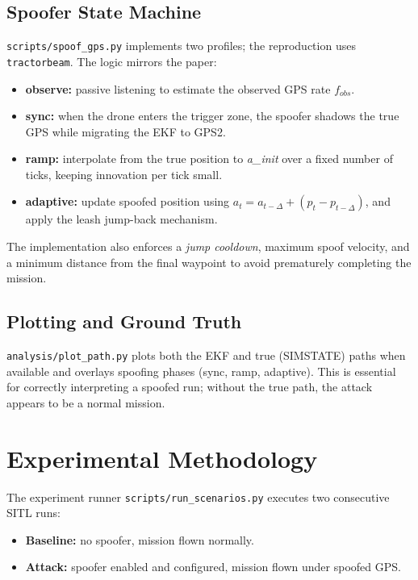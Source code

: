 \documentclass[12pt, a4paper]{article}
\begin{document}
\subsection{Spoofer State Machine}
\texttt{scripts/spoof\_gps.py} implements two profiles; the reproduction uses \texttt{tractorbeam}. The logic mirrors the paper:
\begin{itemize}[noitemsep]
  \item \textbf{observe:} passive listening to estimate the observed GPS rate $f_{obs}$.
  \item \textbf{sync:} when the drone enters the trigger zone, the spoofer shadows the true GPS while migrating the EKF to GPS2.
  \item \textbf{ramp:} interpolate from the true position to \textit{a\_init} over a fixed number of ticks, keeping innovation per tick small.
  \item \textbf{adaptive:} update spoofed position using $a_t = a_{t-\Delta} + (p_t - p_{t-\Delta})$, and apply the leash jump-back mechanism.
\end{itemize}

The implementation also enforces a \textit{jump cooldown}, maximum spoof velocity, and a minimum distance from the final waypoint to avoid prematurely completing the mission.

\subsection{Plotting and Ground Truth}
\texttt{analysis/plot\_path.py} plots both the EKF and true (SIMSTATE) paths when available and overlays spoofing phases (sync, ramp, adaptive). This is essential for correctly interpreting a spoofed run; without the true path, the attack appears to be a normal mission.

\section{Experimental Methodology}

The experiment runner \texttt{scripts/run\_scenarios.py} executes two consecutive SITL runs:
\begin{itemize}[noitemsep]
  \item \textbf{Baseline:} no spoofer, mission flown normally.
  \item \textbf{Attack:} spoofer enabled and configured, mission flown under spoofed GPS.
\end{itemize}
\end{document}
